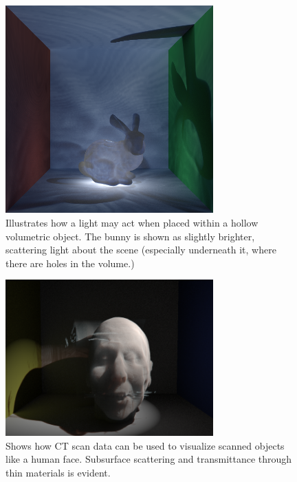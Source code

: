 \documentclass[12pt]{ucthesis}
\begin{document}
\begin{figure}[h!]
    \centering
    \includegraphics[width=80mm]{img/bunny_glow.png}
    \caption{Illustrates how a light may act when placed within a hollow volumetric object.  The bunny is shown as slightly brighter, scattering light about the scene (especially underneath it, where there are holes in the volume.)}
\end{figure}

\begin{figure}[h!]
    \centering
    \includegraphics[width=80mm]{img/face1.png}
    \caption{Shows how CT scan data can be used to visualize scanned objects like a human face.  Subsurface scattering and transmittance through thin materials is evident.}
\end{figure}
\end{document}
